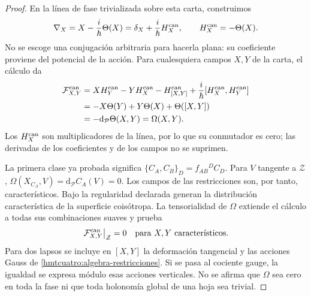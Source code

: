 \begin{proof}
En la línea de fase trivializada sobre esta carta, construimos
\begin{equation}
 \nabla_X=X-\frac{i}{\hbar}\Theta(X)
       =\delta_X+\frac{i}{\hbar}H_X^{\rm can},
 \qquad H_X^{\rm can}=-\Theta(X).
 \label{hmtcuatro:conexion-canonica}
\end{equation}
No se escoge una conjugación arbitraria para hacerla plana:
su coeficiente proviene del potencial de la acción.
Para cualesquiera campos \(X,Y\) de la carta, el cálculo da
\begin{equation}
 \begin{aligned}
 \mathcal F^{\rm can}_{X,Y}
 &=XH_Y^{\rm can}-YH_X^{\rm can}-H_{[X,Y]}^{\rm can}
       +\frac{i}{\hbar}[H_X^{\rm can},H_Y^{\rm can}]\\
 &=-X\Theta(Y)+Y\Theta(X)+\Theta([X,Y])\\
 &=-\mathrm d_{\mathcal P}\Theta(X,Y)=\Omega(X,Y).
 \end{aligned}
 \label{hmtcuatro:curvatura-calculada}
\end{equation}
Los \(H_X^{\rm can}\) son multiplicadores de la línea, por lo que
su conmutador es cero; las derivadas de los coeficientes y de los
campos no se suprimen.

La primera clase ya probada significa
\(\{C_A,C_B\}_D=f_{AB}{}^D C_D\).
Para \(V\) tangente a \(\mathcal Z\),
\(\Omega(X_{C_A},V)=\mathrm d_{\mathcal P}C_A(V)=0\).
Los campos de las restricciones son, por tanto, característicos.
Bajo la regularidad declarada generan la distribución característica
de la superficie coisótropa. La tensorialidad de \(\Omega\) extiende
el cálculo a todas sus combinaciones suaves y prueba
\begin{equation}
 \left.\mathcal F^{\rm can}_{X,Y}\right|_{\mathcal Z}=0
 \quad\hbox{para }X,Y\hbox{ característicos}.
 \label{hmtcuatro:cierre-caracteristico}
\end{equation}
Para dos lapsos se incluye en \([X,Y]\) la deformación tangencial
y las acciones Gauss de \eqref{hmtcuatro:algebra-restricciones}.
Si se pasa al cociente gauge, la igualdad se expresa módulo esas
acciones verticales. No se afirma que \(\Omega\) sea cero en toda
la fase ni que toda holonomía global de una hoja sea trivial.


\end{proof}
